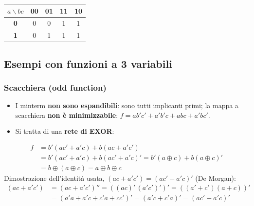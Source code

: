 \documentclass[12pt, a4paper]{article}
\begin{document}
\begin{center}
\renewcommand{\arraystretch}{1.25}
\begin{tabular}[t]{|c|c|c|c|c|}
\hline
\colorbox{gray!25}{\color{black}$a\backslash bc$} & \colorbox{gray!25}{\color{black}\textbf{00}} & \colorbox{gray!25}{\color{black}\textbf{01}} & \colorbox{gray!25}{\color{black}\textbf{11}} & \colorbox{gray!25}{\color{black}\textbf{10}} \\ \hline
\colorbox{gray!25}{\color{black}\textbf{0}} & 0 & 0 & \colorbox{blue!25}{\color{black}1} & \colorbox{blue!25}{\color{black}1} \\ \hline
\colorbox{gray!25}{\color{black}\textbf{1}} & 0 & \colorbox{green!30}{\color{black}1} & \colorbox{orange!55}{\color{black}1} & \colorbox{blue!25}{\color{black}1} \\ \hline
\end{tabular}
\end{center}

\subsection{Esempi con funzioni a 3 variabili}

\subsubsection{Scacchiera (odd function)}
\begin{itemize}
    \item I minterm \textbf{non sono espandibili}: sono tutti implicanti primi; la mappa a scacchiera \textbf{non è minimizzabile}: $f = ab'c' + a'b'c + abc + a'bc'$.
    \item Si tratta di una \textbf{rete di EXOR}:
\end{itemize}
\begin{align*}
f &= b'(ac' + a'c) + b(ac + a'c') \\
 &= b'(ac' + a'c) + b(ac' + a'c)' = b'(a \oplus c) + b(a \oplus c)' \\
 &= b \oplus (a \oplus c) = a \oplus b \oplus c
\end{align*}
Dimostrazione dell'identità usata, $(ac + a'c') = (ac' + a'c)'$ (De Morgan):
\begin{align*}
(ac + a'c') &= (ac + a'c')'' = ((ac)'\,(a'c')')' = ((a' + c')(a + c))' \\
 &= (a'a + a'c + c'a + cc')' = (a'c + c'a)' = (ac' + a'c)'
\end{align*}
\end{document}
